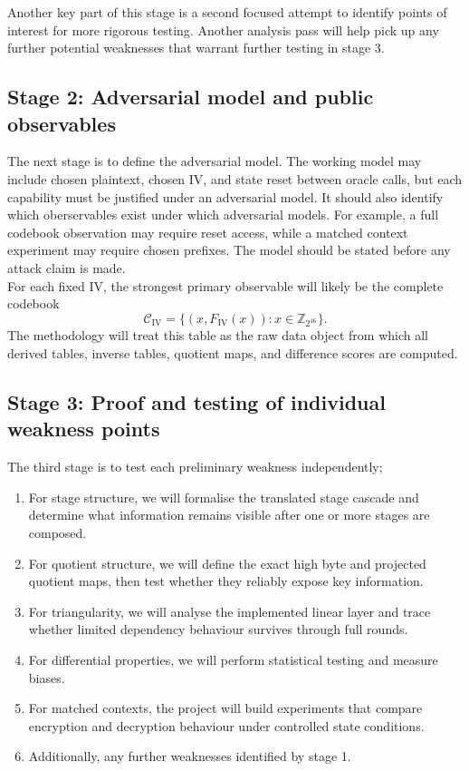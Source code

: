 \documentclass[11pt]{article}
\newcommand{\Z}[1]{\mathbb{Z}_{#1}}
\begin{document}
Another key part of this stage is a second focused attempt to identify points of interest for more rigorous testing. Another analysis pass will help pick up any further potential weaknesses that warrant further testing in stage 3.

\subsection{Stage 2: Adversarial model and public observables}

The next stage is to define the adversarial model. The working model may include chosen plaintext, chosen IV, and state reset between oracle calls, but each capability must be justified under an adversarial model. It should also identify which oberservables exist under which adversarial models. For example, a full codebook observation may require reset access, while a matched context experiment may require chosen prefixes. The model should be stated before any attack claim is made.\\

For each fixed IV, the strongest primary observable will likely be the complete codebook
\[
\mathcal{C}_{\mathrm{IV}}=\{(x,F_{\mathrm{IV}}(x)):x\in\Z{2^{16}}\}.
\]
The methodology will treat this table as the raw data object from which all derived tables, inverse tables, quotient maps, and difference scores are computed.

\subsection{Stage 3: Proof and testing of individual weakness points}

The third stage is to test each preliminary weakness independently;

\begin{enumerate}
\item For stage structure, we will formalise the translated stage cascade and determine what information remains visible after one or more stages are composed.
\item For quotient structure, we will define the exact high byte and projected quotient maps, then test whether they reliably expose key information.
\item For triangularity, we will analyse the implemented linear layer and trace whether limited dependency behaviour survives through full rounds.
\item For differential properties, we will perform statistical testing and measure biases.
\item For matched contexts, the project will build experiments that compare encryption and decryption behaviour under controlled state conditions.
\item Additionally, any further weaknesses identified by stage 1.
\end{enumerate}
\end{document}
